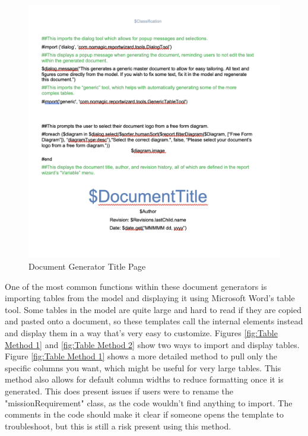 \begin{figure}[H]
    \centering
    \includegraphics[width=\textwidth]{Thesis/Analysis_and_Results/Analysis and Results Figures/Document Generator Title Page.png}
    \caption{Document Generator Title Page}
    \label{fig:Document Generator Title Page}
\end{figure}

One of the most common functions within these document generators is importing tables from the model and displaying it using Microsoft Word's table tool. Some tables in the model are quite large and hard to read if they are copied and pasted onto a document, so these templates call the internal elements instead and display them in a way that's very easy to customize. Figures \ref{fig:Table Method 1} and \ref{fig:Table Method 2} show two ways to import and display tables. Figure \ref{fig:Table Method 1} shows a more detailed method to pull only the specific columns you want, which might be useful for very large tables. This method also allows for default column widths to reduce formatting once it is generated. This does present issues if users were to rename the "missionRequirement" class, as the code wouldn't find anything to import. The comments in the code should make it clear if someone opens the template to troubleshoot, but this is still a risk present using this method.

